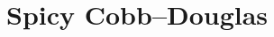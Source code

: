 \documentclass[11pt]{article}
\begin{document}
\begin{enumerate}











\end{enumerate}
\section{Spicy Cobb--Douglas}
\end{document}
